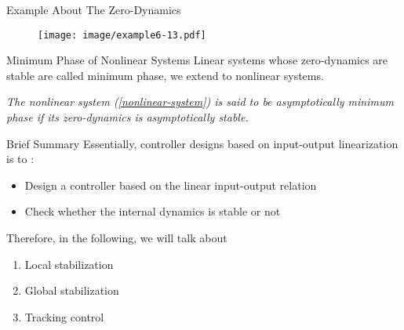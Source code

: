 \documentclass{beamer}
\begin{document}
\begin{frame}{Example About The Zero-Dynamics}
    \begin{figure}
      \centering
      \texttt{[image: image/example6-13.pdf]}
    \end{figure}
\end{frame}


\begin{frame}{Minimum Phase of Nonlinear Systems}
    Linear systems whose zero-dynamics are stable are called {\color{red}minimum phase}, we extend to nonlinear systems.
    \begin{definition}[6.8]
        \textit{
        The nonlinear system (\ref{nonlinear-system}) is said to be {\color{red}asymptotically minimum phase} if its zero-dynamics is asymptotically stable.
        }
    \end{definition}
\end{frame}

\begin{frame}{Brief Summary}
    Essentially, controller designs based on {\color{red}input-output linearization} is to :
    \begin{itemize}
      \item Design a controller based on the linear input-output relation
      \item Check whether the internal dynamics is stable or not
    \end{itemize}
     Therefore, in the following, we will talk about
     \begin{enumerate}
       \item Local stabilization
       \item Global stabilization
       \item Tracking control
     \end{enumerate}
\end{frame}
\end{document}
